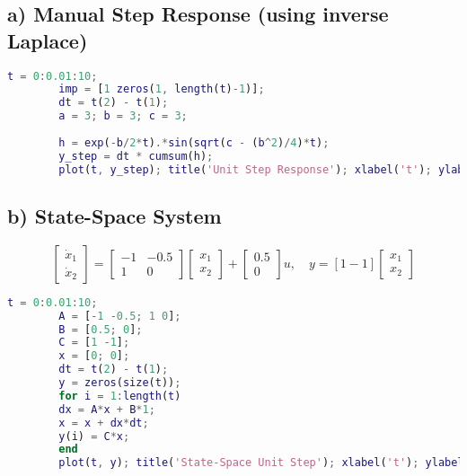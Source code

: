 \documentclass{article}
\begin{document}
	\subsection*{a) Manual Step Response (using inverse Laplace)}
	\begin{lstlisting}[language=Matlab, caption=Manual step response using convolution]
		t = 0:0.01:10;
		imp = [1 zeros(1, length(t)-1)];
		dt = t(2) - t(1);
		a = 3; b = 3; c = 3;
		
		h = exp(-b/2*t).*sin(sqrt(c - (b^2)/4)*t);
		y_step = dt * cumsum(h);
		plot(t, y_step); title('Unit Step Response'); xlabel('t'); ylabel('y(t)');
	\end{lstlisting}
	
	\subsection*{b) State-Space System}
	\[
	\begin{bmatrix}
		\dot{x}_1 \\ \dot{x}_2
	\end{bmatrix}
	=
	\begin{bmatrix}
		-1 & -0.5\\
		1 & 0
	\end{bmatrix}
	\begin{bmatrix}
		x_1 \\ x_2
	\end{bmatrix}
	+
	\begin{bmatrix}
		0.5\\
		0
	\end{bmatrix} u,
	\quad
	y = [1 -1] \begin{bmatrix}
		x_1 \\ x_2
	\end{bmatrix}
	\]
	
	\begin{lstlisting}[language=Matlab, caption=Manual response of state-space]
		t = 0:0.01:10;
		A = [-1 -0.5; 1 0];
		B = [0.5; 0];
		C = [1 -1];
		x = [0; 0];
		dt = t(2) - t(1);
		y = zeros(size(t));
		for i = 1:length(t)
		dx = A*x + B*1;
		x = x + dx*dt;
		y(i) = C*x;
		end
		plot(t, y); title('State-Space Unit Step'); xlabel('t'); ylabel('y');
	\end{lstlisting}
	
\end{document}
